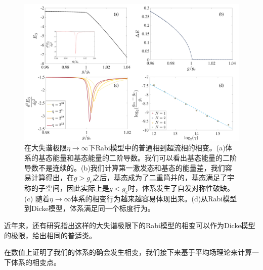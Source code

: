 \documentclass[supercite]{HustGraduPaper}
\begin{document}
\begin{figure}
	\centering
	\includegraphics[width=0.9\linewidth]{Figures/Rabi/S4}
	\caption{在大失谐极限$\eta \to \infty$下Rabi模型中的普通相到超流相的相变。(a)体系的基态能量和基态能量的二阶导数。我们可以看出基态能量的二阶导数不是连续的。(b)我们计算第一激发态和基态的能量差，我们容易计算得出，在$g>g_c$之后，基态成为了二重简并的，基态满足了宇称的子空间，因此实际上是$g<g_c$时，体系发生了自发对称性破缺。(c) 随着$\eta \to \infty$体系的相变行为越来越容易体现出来。(d)从Rabi模型到Dicke模型，体系满足同一个标度行为。}
	\label{fig:Rabi}
\end{figure}

近年来，还有研究指出这样的大失谐极限下的Rabi模型的相变可以作为Dicke模型的极限，给出相同的普适类\cite{sun2018out}。

在数值上证明了我们的体系的确会发生相变，我们接下来基于平均场理论来计算一下体系的相变点。
\end{document}
